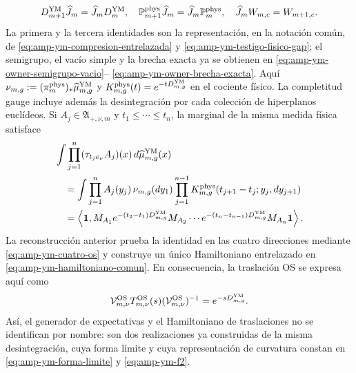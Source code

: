 \begin{equation}\label{eq:pdf2-g-gau-entrelazamiento-dato}
 D_{m+1}^{\rm YM}\widehat J_m=\widehat J_mD_m^{\rm YM},
 \quad
 \mathbb P_{m+1}^{\rm phys}\widehat J_m
  =\widehat J_m\mathbb P_m^{\rm phys},
 \quad
 \widehat J_mW_{m,c}=W_{m+1,c}.
\end{equation}
La primera y la tercera identidades son la representación, en la notación
común, de \eqref{eq:amp-ym-compresion-entrelazada} y
\eqref{eq:amp-ym-testigo-fisico-gap}; el semigrupo, el vacío simple y la
brecha exacta ya se obtienen en
\eqref{eq:amp-ym-owner-semigrupo-vacio}--
\eqref{eq:amp-ym-owner-brecha-exacta}. Aquí
$\nu_{m,g}:=(\pi_m^{\rm phys})_*\widehat\mu_{m,g}^{\rm YM}$ y
$K_{m,g}^{\rm phys}(t)=e^{-tD_{m,g}^{\rm YM}}$ en el cociente físico.
La completitud gauge incluye además la desintegración por cada colección de
hiperplanos euclídeos. Si $A_j\in\mathfrak A_{+,\nu,m}$ y
$t_1\le\cdots\le t_n$, la marginal de la misma medida física satisface
\begin{equation}\label{eq:pdf2-g-gau-transfer-euclidean-dato}
\begin{aligned}
 &\int\prod_{j=1}^n
   (\tau_{t_je_\nu}A_j)(x)\,d\widehat\mu_{m,g}^{\rm YM}(x)\\
 &\quad=
 \int\prod_{j=1}^nA_j(y_j)\,
  \nu_{m,g}(dy_1)
  \prod_{j=1}^{n-1}K_{m,g}^{\rm phys}
       (t_{j+1}-t_j;y_j,dy_{j+1})\\
 &\quad=
 \left\langle\mathbf1,
  M_{A_1}e^{-(t_2-t_1)D_{m,g}^{\rm YM}}M_{A_2}\cdots
  e^{-(t_n-t_{n-1})D_{m,g}^{\rm YM}}M_{A_n}\mathbf1
 \right\rangle.
\end{aligned}
\end{equation}
La reconstrucción anterior prueba la identidad en las cuatro direcciones
mediante \eqref{eq:amp-ym-cuatro-os} y construye un único Hamiltoniano
entrelazado en \eqref{eq:amp-ym-hamiltoniano-comun}. En consecuencia, la
traslación OS se expresa aquí como
\begin{equation}\label{eq:pdf2-g-gau-os-generator-dato}
 \mathcal V_{m,\nu}^{\rm OS}T_{m,\nu}^{\rm OS}(s)
 (\mathcal V_{m,\nu}^{\rm OS})^{-1}
 =e^{-sD_{m,g}^{\rm YM}}.
\end{equation}
Así, el generador de expectativas y el Hamiltoniano de traslaciones no se
identifican por nombre: son dos realizaciones ya construidas de la misma
desintegración, cuya forma límite y cuya representación de curvatura constan en
\eqref{eq:amp-ym-forma-limite} y \eqref{eq:amp-ym-f2}.
